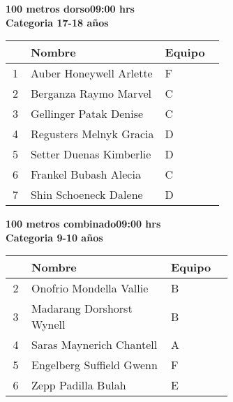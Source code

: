 \begin{minipage}{0.95\linewidth}\vspace{0.5cm} 
\begin{flushleft}
\textbf{
\hspace{-0.15cm}100 metros dorso\hspace{1.5cm}09:00 hrs \\Categoria 17-18 años}\vspace{-0.2cm} 
\end{flushleft}
\begin{tabular}{cp{0.63\linewidth}l}
\hline
& \textbf{Nombre} & \textbf{Equipo} \\ \hline
1 & Auber Honeywell Arlette & F \\ 
2 & Berganza Raymo Marvel & C \\ 
3 & Gellinger Patak Denise & C \\ 
4 & Regusters Melnyk Gracia & D \\ 
5 & Setter Duenas Kimberlie & D \\ 
6 & Frankel Bubash Alecia & C \\ 
7 & Shin Schoeneck Dalene & D \\ 
\end{tabular}
\end{minipage}
\begin{minipage}{0.95\linewidth}\vspace{0.5cm} 
\begin{flushleft}
\textbf{
\hspace{-0.15cm}100 metros combinado\hspace{1.5cm}09:00 hrs \\Categoria 9-10 años}\vspace{-0.2cm} 
\end{flushleft}
\begin{tabular}{cp{0.63\linewidth}l}
\hline
& \textbf{Nombre} & \textbf{Equipo} \\ \hline
2 & Onofrio Mondella Vallie & B \\ 
3 & Madarang Dorshorst Wynell & B \\ 
4 & Saras Maynerich Chantell & A \\ 
5 & Engelberg Suffield Gwenn & F \\ 
6 & Zepp Padilla Bulah & E \\ 
\end{tabular}
\end{minipage}
